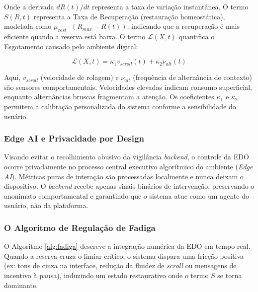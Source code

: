 \documentclass{sbc2023}
\begin{document}
Onde a derivada $dR(t)/dt$ representa a taxa de variação instantânea. O termo $S(R, t)$ representa a Taxa de Recuperação (restauração homeostática), modelada como $\mu_{rest} \cdot (R_{max} - R(t))$, indicando que a recuperação é mais eficiente quando a reserva está baixa. O termo $\mathcal{L}(X, t)$ quantifica o Esgotamento causado pelo ambiente digital:

\begin{equation} \label{eq:load}
    \mathcal{L}(X, t) = \kappa_1 v_{scroll}(t) + \kappa_2 \nu_{alt}(t)
\end{equation}

Aqui, $v_{scroll}$ (velocidade de rolagem) e $\nu_{alt}$ (frequência de alternância de contexto) são sensores comportamentais. Velocidades elevadas indicam consumo superficial, enquanto alternâncias bruscas fragmentam a atenção. Os coeficientes $\kappa_1$ e $\kappa_2$ permitem a calibração personalizada do sistema conforme a sensibilidade do usuário.

\subsubsection{Edge AI e Privacidade por Design} \label{sec:edo_comp}

Visando evitar o recolhimento abusivo da vigilância \textit{backend}, o controle da EDO ocorre privadamente no processo central executivo algorítmico do ambiente (\textit{Edge AI}). Métricas puras de interação são processadas localmente e nunca deixam o dispositivo. O \textit{backend} recebe apenas sinais binários de intervenção, preservando o anonimato comportamental e garantindo que o sistema atue como um agente do usuário, não da plataforma.

\subsubsection{O Algoritmo de Regulação de Fadiga} \label{sec:edo_reg}

O Algoritmo \ref{alg:fadiga} descreve a integração numérica da EDO em tempo real. Quando a reserva cruza o limiar crítico, o sistema dispara uma fricção positiva (ex: tons de cinza na interface, redução da fluidez de \textit{scroll} ou mensagens de incentivo à pausa), induzindo um estado restaurativo onde o termo $S$ se torna dominante.

\begin{algorithm}[h]
\caption{Sub-rotina de Regulação de Fadiga (Execução On-Device)}
\label{alg:fadiga}
\end{algorithm}
\end{document}
